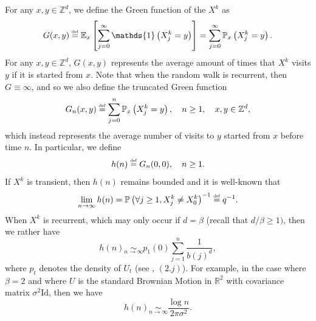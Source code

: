 \documentclass[10pt,a4paper]{amsart}
\newcommand{\RR}{\mathbb R}
\newcommand{\EE}{\mathbb E}
\newcommand{\PP}{\mathbb P}
\newcommand{\1}{\mathds{1}}
\newcommand{\ZZ}{\mathbb Z}
\newcommand{\eqdef}{\stackrel{\scaleto{\mathrm{def}}{3.5pt}}{=}}
\numberwithin{equation}{section}
\begin{document}
For any $x,y\in\ZZ^d$, we define the Green function of the $X^k$ as 
\begin{equation*}
    G(x,y)\eqdef\EE_x\left[\sum_{j=0}^\infty\1\left(X_j^k=y\right)\right]=\sum_{j=0}^\infty\PP_x\left(X_j^k=y\right).
\end{equation*}
For any $x,y\in\ZZ^d$, $G(x,y)$ represents the average amount of times that $X^k$ visits $y$ if it is started from $x$. Note that when the random walk is recurrent, then $G\equiv\infty$, and so we also define the truncated Green function
\begin{equation*}
    G_{n}(x,y)\eqdef\sum_{j=0}^n\PP_x\left(X_j^k=y\right),\quad n\ge1,\quad x,y\in\ZZ^d,
\end{equation*}
which instead represents the average number of visits to $y$ started from $x$ before time $n$. In particular, we define
\begin{equation*}
    h(n)\eqdef G_{n}(0,0),\quad n\ge1.
\end{equation*}
If $X^k$ is transient, then $h(n)$ remains bounded and it is well-known that 
\begin{equation*}
    \lim_{n\rightarrow\infty} h(n)=\PP\left(\forall j\ge1, X_j^k\ne X_0^k\right)^{-1}\eqdef q^{-1}.
\end{equation*}
When $X^k$ is recurrent, which may only occur if $d=\beta$ (recall that $d/\beta\ge1)$, then we rather have 
\begin{equation}
\label{limit:trunctaed green's function asymptotics}
    h(n)\underset{n\rightarrow\infty}{\sim}p_1(0)\sum_{j=1}^n\frac{1}{b(j)^d},
\end{equation}
where $p_t$ denotes the density of $U_t$ (see \cite{LeGallRosenRangeOfStableRandomWalks1991}, $(2.j)$). For example, in the case where $\beta=2$ and where $U$ is the standard Brownian Motion in $\RR^2$ with covariance matrix $\sigma^2\mathrm{Id}$, then we have
\begin{equation*}
    h(n)\underset{n\rightarrow\infty}\sim\frac{\log n}{2\pi\sigma^2}.
\end{equation*}
\end{document}
